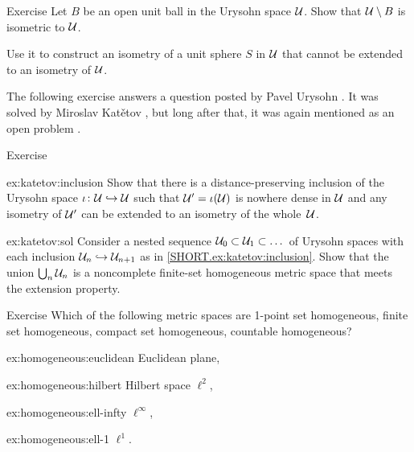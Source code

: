 \begin{thm}{Exercise}\label{ex:ext(shere)}
Let $B$ be an open unit ball in the Urysohn space $\mathcal{U}$.
Show that $\mathcal{U}\setminus B$ is isometric to $\mathcal{U}$.

Use it to construct an isometry of a unit sphere $S$ in $\mathcal{U}$ that cannot be extended to an isometry of $\mathcal{U}$.
\end{thm}

The following exercise answers a question posted by Pavel Urysohn \cite[§$2(6)$]{urysohn}.
It was solved by Miroslav Katětov \cite{katetov},
but long after that, it was again mentioned as an open problem \cite[p. 83]{gromov-2007}.

\begin{thm}{Exercise}\label{ex:katetov}

\begin{subthm}{ex:katetov:inclusion}
Show that there is a distance-preserving inclusion of the Urysohn space $\iota\colon\mathcal{U}\hookrightarrow \mathcal{U}$ 
such that $\mathcal{U}'=\iota(\mathcal{U})$ is nowhere dense in $\mathcal{U}$ and any isometry of $\mathcal{U}'$ 
can be extended to an isometry of the whole~$\mathcal{U}$.
\end{subthm}

\begin{subthm}{ex:katetov:sol}
Consider a nested sequence $\mathcal{U}_0\subset \mathcal{U}_1\subset\dots$ of Urysohn spaces 
with each inclusion $\mathcal{U}_n\hookrightarrow \mathcal{U}_{n+1}$ as in \ref{SHORT.ex:katetov:inclusion}.
Show that the union $\bigcup_n\mathcal{U}_n$ is a noncomplete finite-set homogeneous metric space that meets the extension property.
\end{subthm}

\end{thm}

\begin{thm}{Exercise}\label{ex:homogeneous}
Which of the following metric spaces are 
1-point set homogeneous, finite set homogeneous, compact set homogeneous, countable homogeneous?

\begin{subthm}{ex:homogeneous:euclidean}
Euclidean plane,
\end{subthm}

\begin{subthm}{ex:homogeneous:hilbert}
 Hilbert space $\ell^2$,
\end{subthm}

\begin{subthm}{ex:homogeneous:ell-infty}
 $\ell^\infty$,
\end{subthm}

\begin{subthm}{ex:homogeneous:ell-1}
 $\ell^1$.
\end{subthm}
\end{thm}


